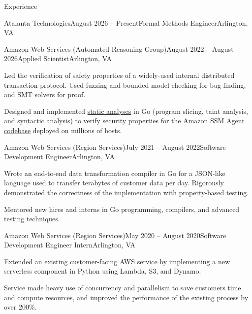 \documentclass{resume}
\begin{document}
\vspace{-1em}
\begin{rSection}{Experience}
  \begin{rSubsection}{Atalanta Technologies}{August 2026 -- Present}{Formal Methods Engineer}{Arlington, VA}
    \item[]
  \end{rSubsection}

  \begin{rSubsection}{Amazon Web Services (Automated Reasoning Group)}{August 2022 -- August 2026}{Applied Scientist}{Arlington, VA}
    \item Led the verification of safety properties of a widely-used internal distributed transaction protocol. Used fuzzing and bounded model checking for bug-finding, and SMT solvers for proof.
    \item Designed and implemented \href{https://github.com/awslabs/ar-go-tools}{static analyses} in Go (program slicing, taint analysis, and syntactic analysis) to verify security properties for the \href{https://github.com/aws/amazon-ssm-agent}{Amazon SSM Agent codebase} deployed on millions of hosts.
  \end{rSubsection}

  \begin{rSubsection}{Amazon Web Services (Region Services)}{July 2021 -- August 2022}{Software Development Engineer}{Arlington, VA}
    \item Wrote an end-to-end data transformation compiler in Go for a JSON-like language used to transfer terabytes of customer data per day. Rigorously demonstrated the correctness of the implementation with property-based testing.
    \item Mentored new hires and interns in Go programming, compilers, and advanced testing techniques.
  \end{rSubsection}

  \begin{rSubsection}{Amazon Web Services (Region Services)}{May 2020 -- August 2020}{Software Development Engineer Intern}{Arlington, VA}
    \item Extended an existing customer-facing AWS service by implementing a new serverless component in Python using Lambda, S3, and Dynamo.
    \item Service made heavy use of concurrency and parallelism to save customers time and compute resources, and improved the performance of the existing process by over 200\%.
  \end{rSubsection}

\end{rSection}
\end{document}
